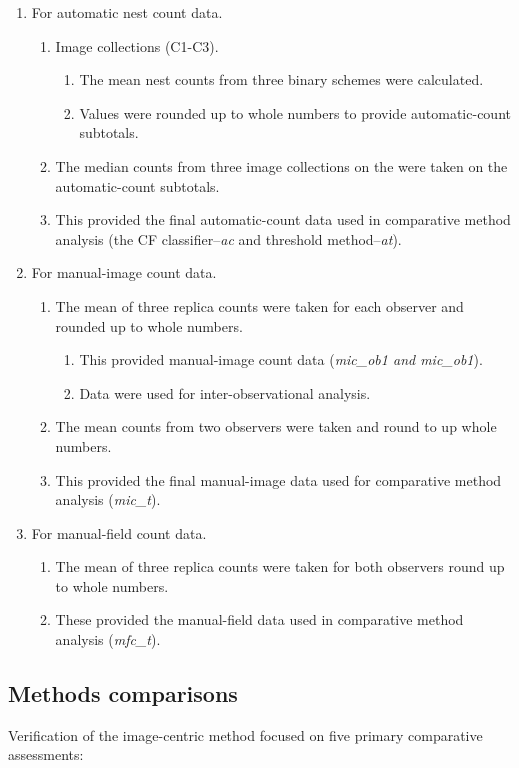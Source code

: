 \begin{enumerate}
\item For automatic nest count data.
	\begin{enumerate}
	\item Image collections (C1-C3).
		\begin{enumerate}
		\item The mean nest counts from three binary schemes were calculated. 
		\item Values were rounded up to whole numbers to provide automatic-count subtotals.
		\end{enumerate}
	\item The median counts from three image collections on the were taken on the automatic-count subtotals. 
	\item This provided the final automatic-count data used in comparative method analysis (the CF classifier--\emph{ac} and threshold method--\emph{at}).
	\end{enumerate}
\item For manual-image count data.
	\begin{enumerate}
	\item The mean of three replica counts were taken for each observer and rounded up to whole numbers.
		\begin{enumerate} 
		\item This provided manual-image count data (\emph{mic\_ob1 and mic\_ob1}).
		\item Data were used for inter-observational analysis.
		\end{enumerate}
	\item The mean counts from two observers were taken and round to up whole numbers. 
	\item This provided the final manual-image data used for comparative method analysis (\emph{mic\_t}).
	\end{enumerate}
\item For manual-field count data.
	\begin{enumerate}
	\item The mean of three replica counts were taken for both observers round up to whole numbers. 
	\item These provided the manual-field data used in comparative method analysis (\emph{mfc\_t}).
	\end{enumerate}
\end{enumerate}

\subsection{Methods comparisons}\label{sec:methods-comparisons}
Verification of the image-centric method focused on five primary comparative assessments:

